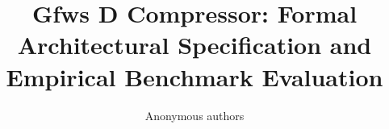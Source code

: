 \title{\textbf{Gfws D Compressor: Formal Architectural Specification and Empirical Benchmark Evaluation}}

\author{Anonymous authors}
